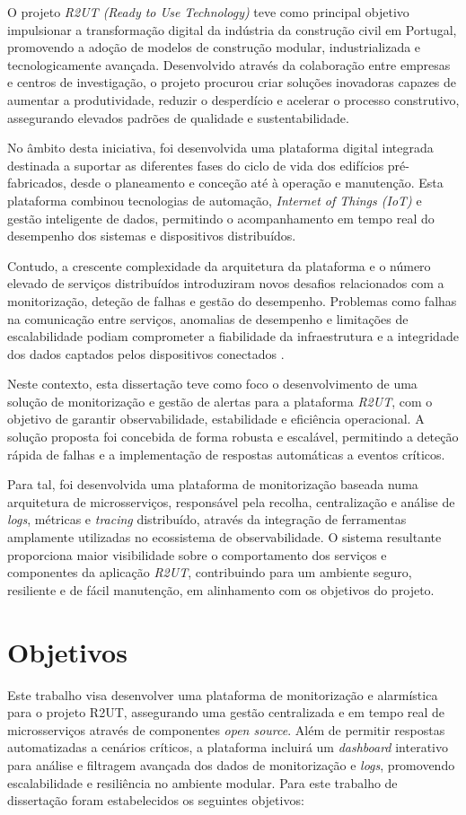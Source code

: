 O projeto \textit{R2UT (Ready to Use Technology)} teve como principal objetivo impulsionar a transformação digital da indústria da construção civil em Portugal, promovendo a adoção de modelos de construção modular, industrializada e tecnologicamente avançada. Desenvolvido através da colaboração entre empresas e centros de investigação, o projeto procurou criar soluções inovadoras capazes de aumentar a produtividade, reduzir o desperdício e acelerar o processo construtivo, assegurando elevados padrões de qualidade e sustentabilidade.

No âmbito desta iniciativa, foi desenvolvida uma plataforma digital integrada destinada a suportar as diferentes fases do ciclo de vida dos edifícios pré-fabricados, desde o planeamento e conceção até à operação e manutenção. Esta plataforma combinou tecnologias de automação, \textit{Internet of Things (IoT)} e gestão inteligente de dados, permitindo o acompanhamento em tempo real do desempenho dos sistemas e dispositivos distribuídos.

Contudo, a crescente complexidade da arquitetura da plataforma e o número elevado de serviços distribuídos introduziram novos desafios relacionados com a monitorização, deteção de falhas e gestão do desempenho. Problemas como falhas na comunicação entre serviços, anomalias de desempenho e limitações de escalabilidade podiam comprometer a fiabilidade da infraestrutura e a integridade dos dados captados pelos dispositivos conectados \cite{Barakat2017}.

Neste contexto, esta dissertação teve como foco o desenvolvimento de uma solução de monitorização e gestão de alertas para a plataforma \textit{R2UT}, com o objetivo de garantir observabilidade, estabilidade e eficiência operacional. A solução proposta foi concebida de forma robusta e escalável, permitindo a deteção rápida de falhas e a implementação de respostas automáticas a eventos críticos.

Para tal, foi desenvolvida uma plataforma de monitorização baseada numa arquitetura de microsserviços, responsável pela recolha, centralização e análise de \textit{logs}, métricas e \textit{tracing} distribuído, através da integração de ferramentas amplamente utilizadas no ecossistema de observabilidade. O sistema resultante proporciona maior visibilidade sobre o comportamento dos serviços e componentes da aplicação \textit{R2UT}, contribuindo para um ambiente seguro, resiliente e de fácil manutenção, em alinhamento com os objetivos do projeto.

\section{Objetivos}
Este trabalho visa desenvolver uma plataforma de monitorização e alarmística para o projeto R2UT, assegurando uma gestão centralizada e em tempo real de microsserviços através de componentes \textit{open source}. Além de permitir respostas automatizadas a cenários críticos, a plataforma incluirá um \textit{dashboard} interativo para análise e filtragem avançada dos dados de monitorização e \textit{logs}, promovendo escalabilidade e resiliência no ambiente modular.
Para este trabalho de dissertação foram estabelecidos os seguintes objetivos:

